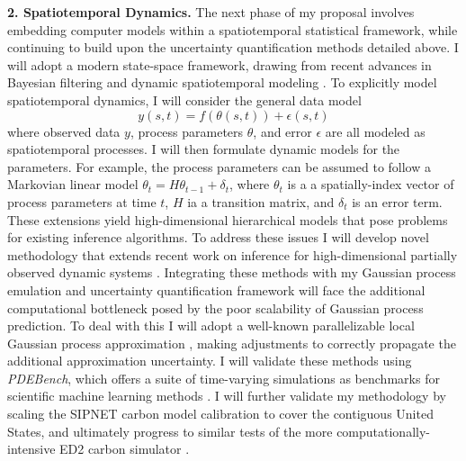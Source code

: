 \documentclass[12pt]{article}
\begin{document}
 \textbf{2. Spatiotemporal Dynamics.}
 The next phase of my proposal involves embedding computer models within a spatiotemporal statistical framework, while continuing to build upon the uncertainty quantification methods detailed above. I will adopt a modern state-space framework, drawing from recent advances in Bayesian filtering 
 \cite{Sarkka} and dynamic spatiotemporal modeling \cite{Wikle, Hefley}.  
To explicitly model spatiotemporal dynamics, I will consider the general data model
 \[y(s, t) = f(\theta(s, t)) + \epsilon(s, t)\]
 where observed data $y$, process parameters $\theta$, and error $\epsilon$ are all modeled as spatiotemporal processes. I will then formulate dynamic models for the parameters. For example, the process parameters can be assumed to follow a Markovian linear model 
 $\theta_t = H \theta_{t - 1} + \delta_t$, where $\theta_t$ is a a spatially-index vector of process parameters at time $t$, $H$ ia a transition matrix, and $\delta_t$ is an error term. 
These extensions yield high-dimensional 
 hierarchical models that pose problems for existing inference algorithms. To address these issues I will develop novel methodology that extends recent work on inference for high-dimensional partially observed dynamic systems \cite{Park}. Integrating these methods with my Gaussian process emulation and uncertainty quantification framework will face the additional computational bottleneck posed by the poor scalability of Gaussian process prediction. To deal with this I will adopt a well-known parallelizable local Gaussian process approximation \cite{Gramacy}, making adjustments to correctly propagate the additional approximation uncertainty. I will validate these methods using \textit{PDEBench}, which offers a suite of time-varying simulations as benchmarks for scientific machine learning methods \cite{Takamoto}. I will further validate my methodology by scaling the SIPNET carbon model calibration to cover the contiguous United States, and ultimately progress to similar tests of the more computationally-intensive ED2 carbon simulator \cite{Fer, Fer2}.
\end{document}
